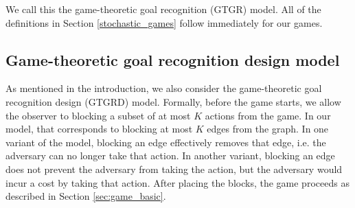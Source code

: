 We call this the game-theoretic goal recognition (GTGR) model. 
All of the definitions in Section \ref{stochastic_games} follow immediately for our games. 

\subsection{Game-theoretic goal recognition design model}
As mentioned in the introduction, we also consider the 
game-theoretic goal recognition design (GTGRD) model.
Formally, before the game starts, we allow the observer to blocking a subset 
of at most $K$ actions from the game. In our model, that corresponds to blocking at most $K$ edges from the graph.
In one variant of the model, blocking an edge effectively removes that edge, i.e. the adversary can no longer take that action. 
In another variant, blocking an edge does not prevent the adversary from taking the action,
but the adversary would incur a cost by taking that action.
After placing the blocks, the game proceeds as described in Section \ref{sec:game_basic}.
\nocite{Dijkstra80}
\nocite{plop03-paper}
